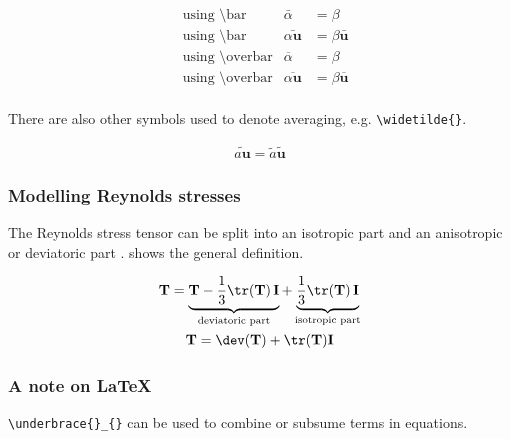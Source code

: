 \begin{align}
	&\text{using \textbackslash{}bar} & \bar{\alpha} &= \beta \\ %
	&\text{using \textbackslash{}bar} & \bar{\alpha \mathbf{u}} &= \beta \bar{\mathbf{u}} \\ %
	&\text{using \textbackslash{}overbar} & \overbar{\alpha} &= \beta \\ %
	&\text{using \textbackslash{}overbar} & \overbar{\alpha \mathbf{u}} &= \beta \overbar{\mathbf{u}} \\ %
\end{align}

There are also other symbols used to denote averaging, e.g. \verb+\widetilde{}+.

\begin{gather}
	\widetilde{a \mathbf{u}} = \widetilde{a} \widetilde{\mathbf{u}}
\end{gather}





\subsubsection{Modelling Reynolds stresses}

The Reynolds stress tensor can be split into an isotropic part and an anisotropic or 
deviatoric part \cite{pope2000}.  shows the general definition.

\begin{gather}
	\mathbf{T} = \underbrace{\mathbf{T} - \frac{1}{3} \tr(\mathbf{T}) \,\mathbf{I}}_{\text{deviatoric part}}
		+ \underbrace{\frac{1}{3} \tr(\mathbf{T}) \,\mathbf{I}}_{\text{isotropic part}} 
		\label{eq:tensorDeviatorDecomposition}\\
	\mathbf{T} = \dev(\mathbf{T}) + \tr(\mathbf{T}) \mathbf{I}
\end{gather}


\subsubsection*{A note on \LaTeX{}}

\verb+\underbrace{}_{}+ can be used to combine or subsume terms in equations.








